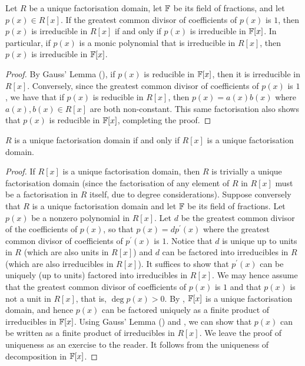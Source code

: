 \begin{cor} \label{cor:gcd-1-implies-equivalence}
    Let $R$ be a unique factorisation domain, let $\mathbb{F}$ be its field of fractions, and let $p(x) \in R[x]$. If the greatest common divisor of coefficients of $p(x)$ is $1$, then $p(x)$ is irreducible in $R[x]$ if and only if $p(x)$ is irreducible in $\mathbb{F}[x]$. In particular, if $p(x)$ is a monic polynomial that is irreducible in $R[x]$, then $p(x)$ is irreducible in $\mathbb{F}[x]$.
\end{cor}
\begin{proof}
    By Gauss' Lemma (), if $p(x)$ is reducible in $\mathbb{F}[x]$, then it is irreducible in $R[x]$. Conversely, since the greatest common divisor of coefficients of $p(x)$ is $1$, we have that if $p(x)$ is reducible in $R[x]$, then $p(x) = a(x) b(x)$ where $a(x), b(x) \in R[x]$ are both non-constant. This same factorisation also shows that $p(x)$ is reducible in $\mathbb{F}[x]$, completing the proof. 
\end{proof}

\begin{theorem}
    $R$ is a unique factorisation domain if and only if $R[x]$ is a unique factorisation domain.
\end{theorem}
\begin{proof}
    If $R[x]$ is a unique factorisation domain, then $R$ is trivially a unique factorisation domain (since the factorisation of any element of $R$ in $R[x]$ must be a factorisation in $R$ itself, due to degree considerations). Suppose conversely that $R$ is a unique factorisation domain and let $\mathbb{F}$ be its field of fractions. Let $p(x)$ be a nonzero polynomial in $R[x]$. Let $d$ be the greatest common divisor of the coefficients of $p(x)$, so that $p(x) = dp^{\prime}(x)$ where the greatest common divisor of coefficients of $p^{\prime}(x)$ is $1$. Notice that $d$ is unique up to units in $R$ (which are also units in $R[x]$) and $d$ can be factored into irreducibles in $R$ (which are also irreducibles in $R[x]$). It suffices to show that $p^{\prime}(x)$ can be uniquely (up to units) factored into irreducibles in $R[x]$. We may hence assume that the greatest common divisor of coefficients of $p(x)$ is $1$ and that $p(x)$ is not a unit in $R[x]$, that is, $\deg p(x) > 0$. By , $\mathbb{F}[x]$ is a unique factorisation domain, and hence $p(x)$ can be factored uniquely as a finite product of irreducibles in $\mathbb{F}[x]$. Using Gauss' Lemma () and , we can show that $p(x)$ can be written as a finite product of irreducibles in $R[x]$. We leave the proof of uniqueness as an exercise to the reader. It follows from the uniqueness of decomposition in $\mathbb{F}[x]$.
\end{proof}


